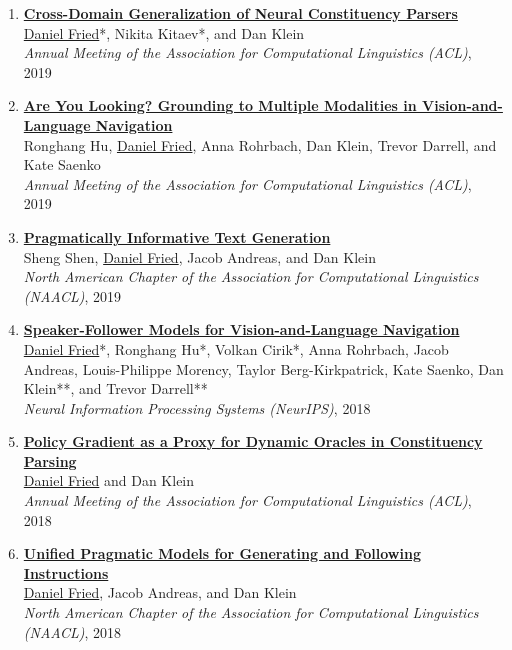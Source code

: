 \begin{enumerate}[leftmargin=-1mm,partopsep=0pt]
\item \href{https://arxiv.org/abs/1907.04347}{\textbf{Cross-Domain Generalization of Neural Constituency Parsers}} \\
  \underline{Daniel Fried}*, Nikita Kitaev*, and Dan Klein\\
  \emph{Annual Meeting of the Association for Computational Linguistics (ACL)}, 2019

\item \href{https://arxiv.org/abs/1906.00347}{\textbf{Are You Looking? Grounding to Multiple Modalities in Vision-and-Language Navigation}} \\
  Ronghang Hu, \underline{Daniel Fried}, Anna Rohrbach, Dan Klein, Trevor Darrell, and Kate Saenko\\
  \emph{Annual Meeting of the Association for Computational Linguistics (ACL)}, 2019

\item \href{https://arxiv.org/abs/1904.01301}{\textbf{Pragmatically Informative Text Generation}} \\
  Sheng Shen, \underline{Daniel Fried}, Jacob Andreas, and Dan Klein\\
  \emph{North American Chapter of the Association for Computational Linguistics (NAACL)}, 2019

\item \href{https://arxiv.org/abs/1806.02724}{\textbf{Speaker-Follower Models for Vision-and-Language Navigation}} \\
  \underline{Daniel Fried}*, Ronghang Hu*, Volkan Cirik*, Anna Rohrbach, Jacob Andreas, Louis-Philippe Morency, Taylor Berg-Kirkpatrick, Kate Saenko, Dan Klein**, and Trevor Darrell** \\
  \emph{Neural Information Processing Systems (NeurIPS)}, 2018

\item \href{https://arxiv.org/abs/1806.03290}{\textbf{Policy Gradient as a Proxy for Dynamic Oracles in Constituency Parsing}} \\
  \underline{Daniel Fried} and Dan Klein\\
  \emph{Annual Meeting of the Association for Computational Linguistics (ACL)}, 2018

\item \href{https://arxiv.org/abs/1711.04987}{\textbf{Unified Pragmatic Models for Generating and Following Instructions}} \\
  \underline{Daniel Fried}, Jacob Andreas, and Dan Klein\\
  \emph{North American Chapter of the Association for Computational Linguistics (NAACL)}, 2018


\end{enumerate}
